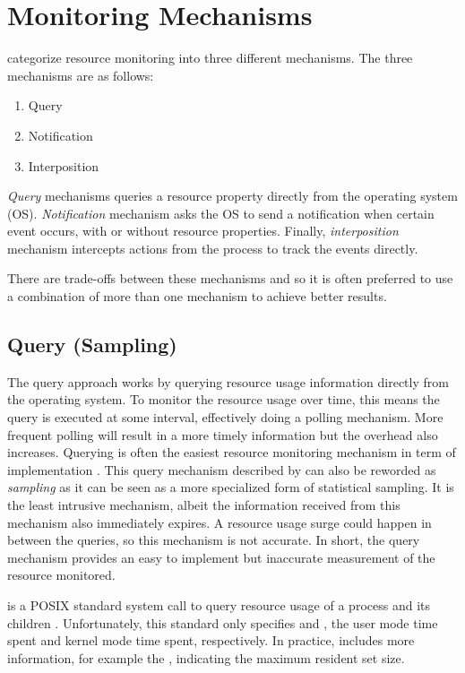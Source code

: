 \section{Monitoring Mechanisms}
\label{sec:resource.mechanisms}

\citet{juvePracticalResourceMonitoring2015} categorize resource monitoring into three different mechanisms.
The three mechanisms are as follows:
\begin{enumerate}[noitemsep]
    \item Query
    \item Notification
    \item Interposition
\end{enumerate}

\emph{Query} mechanisms queries a resource property directly from the operating system (OS).
\emph{Notification} mechanism asks the OS to send a notification when certain event occurs, with or without resource properties.
Finally, \emph{interposition} mechanism intercepts actions from the process to track the events directly.

There are trade-offs between these mechanisms and so it is often preferred to use a combination of more than one mechanism to achieve better results.

\subsection{Query (Sampling)}

The query approach works by querying resource usage information directly from the operating system.
To monitor the resource usage over time, this means the query is executed at some interval, effectively doing a polling mechanism.
More frequent polling will result in a more timely information but the overhead also increases.
Querying is often the easiest resource monitoring mechanism in term of implementation \citep{juvePracticalResourceMonitoring2015}.
This query mechanism described by \citeauthor{juvePracticalResourceMonitoring2015} can also be reworded as \emph{sampling} as it can be seen as a more specialized form of statistical sampling.
It is the least intrusive mechanism, albeit the information received from this mechanism also immediately expires.
A resource usage surge could happen in between the queries, so this mechanism is not accurate.
In short, the query mechanism provides an easy to implement but inaccurate measurement of the resource monitored.

 is a POSIX standard system call to query resource usage of a process and its children \citep{manpages}.
Unfortunately, this standard only specifies  and , the user mode time spent and kernel mode time spent, respectively.
In practice,  includes more information, for example the , indicating the maximum resident set size.

